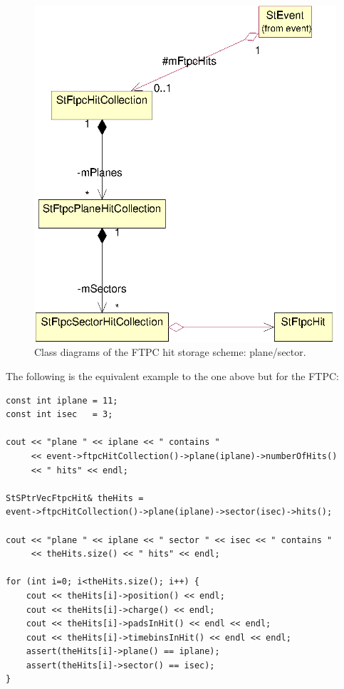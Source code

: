 \documentclass[twoside]{article}
\begin{document}
\begin{figure}[htb]
    \begin{center}
        \includegraphics{ftpc.eps}
        \caption{Class diagrams of the FTPC hit storage scheme: plane/sector.}
        \label{fig:ftpc}
    \end{center}
\end{figure}
The following is the equivalent example to the one above but for the FTPC:
\begin{verbatim}
const int iplane = 11;
const int isec   = 3;

cout << "plane " << iplane << " contains "
     << event->ftpcHitCollection()->plane(iplane)->numberOfHits()
     << " hits" << endl;

StSPtrVecFtpcHit& theHits =
event->ftpcHitCollection()->plane(iplane)->sector(isec)->hits();

cout << "plane " << iplane << " sector " << isec << " contains "
     << theHits.size() << " hits" << endl;

for (int i=0; i<theHits.size(); i++) {
    cout << theHits[i]->position() << endl;
    cout << theHits[i]->charge() << endl;
    cout << theHits[i]->padsInHit() << endl << endl;
    cout << theHits[i]->timebinsInHit() << endl << endl;
    assert(theHits[i]->plane() == iplane);
    assert(theHits[i]->sector() == isec);
}
\end{verbatim}
\end{document}

